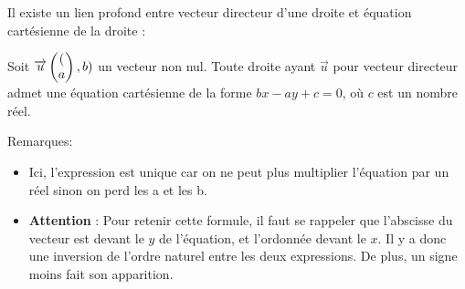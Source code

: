 \documentclass[10pt,a4paper,oneside]{book}
\begin{document}
Il existe un lien profond entre vecteur directeur d'une droite et équation cartésienne de la droite :

\begin{prop}
  Soit $\overrightarrow{u}  \begin{pmatrix} (\\ a \end{pmatrix},b)$ un vecteur non nul. Toute droite ayant $\overrightarrow{u}$ pour vecteur directeur 
  admet une équation cartésienne de la forme $bx-ay+c=0$, où $c$ est un nombre réel.
\end{prop}

Remarques: 
  \begin{itemize}
  \item Ici, l'expression est unique car on ne peut plus multiplier l'équation par un réel sinon on perd les a et les b.
  \item \textbf{Attention} : Pour retenir cette formule, il faut se rappeler que l'abscisse du vecteur est devant le $y$ de l'équation, et l'ordonnée devant le $x$. Il y a donc une inversion de l'ordre naturel entre les deux expressions. De plus, un signe moins fait son apparition.
  \end{itemize}
\end{document}

